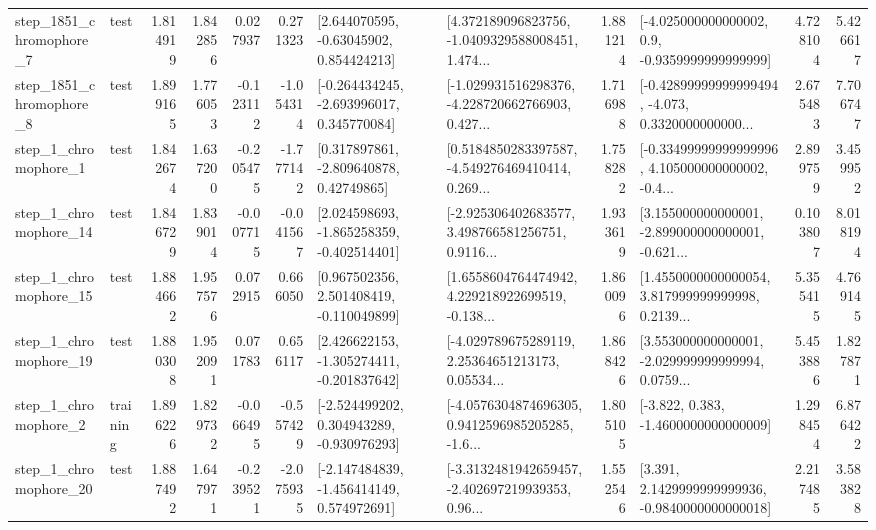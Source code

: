 \begin{tabular}{llrrrrllrlrr}
  step\_1851\_chromophore\_7 &      test &      1.814919 &    1.842856 &      0.027937 &  0.271323 &     [2.644070595, -0.63045902, 0.854424213] &  [4.372189096823756, -1.0409329588008451, 1.474... &       1.881214 &     [-4.025000000000002, 0.9, -0.9359999999999999] &            4.728104 &          5.426617 \\
  step\_1851\_chromophore\_8 &      test &      1.899165 &    1.776053 &     -0.123112 & -1.054314 &   [-0.264434245, -2.693996017, 0.345770084] &  [-1.029931516298376, -4.228720662766903, 0.427... &       1.716988 &  [-0.42899999999999494, -4.073, 0.3320000000000... &            2.675483 &          7.706747 \\
     step\_1\_chromophore\_1 &      test &      1.842674 &    1.637200 &     -0.205475 & -1.777142 &     [0.317897861, -2.809640878, 0.42749865] &  [0.5184850283397587, -4.549276469410414, 0.269... &       1.758282 &  [-0.33499999999999996, 4.105000000000002, -0.4... &            2.899759 &          3.459952 \\
    step\_1\_chromophore\_14 &      test &      1.846729 &    1.839014 &     -0.007715 & -0.041567 &   [2.024598693, -1.865258359, -0.402514401] &  [-2.925306402683577, 3.498766581256751, 0.9116... &       1.933619 &  [3.155000000000001, -2.899000000000001, -0.621... &            0.103807 &          8.018194 \\
    step\_1\_chromophore\_15 &      test &      1.884662 &    1.957576 &      0.072915 &  0.666050 &    [0.967502356, 2.501408419, -0.110049899] &  [1.6558604764474942, 4.229218922699519, -0.138... &       1.860096 &  [1.4550000000000054, 3.817999999999998, 0.2139... &            5.355415 &          4.769145 \\
    step\_1\_chromophore\_19 &      test &      1.880308 &    1.952091 &      0.071783 &  0.656117 &   [2.426622153, -1.305274411, -0.201837642] &  [-4.029789675289119, 2.25364651213173, 0.05534... &       1.868426 &  [3.553000000000001, -2.029999999999994, 0.0759... &            5.453886 &          1.827871 \\
     step\_1\_chromophore\_2 &  training &      1.896226 &    1.829732 &     -0.066495 & -0.557429 &   [-2.524499202, 0.304943289, -0.930976293] &  [-4.0576304874696305, 0.9412596985205285, -1.6... &       1.805105 &               [-3.822, 0.383, -1.4600000000000009] &            1.298454 &          6.876422 \\
    step\_1\_chromophore\_20 &      test &      1.887492 &    1.647971 &     -0.239521 & -2.075935 &   [-2.147484839, -1.456414149, 0.574972691] &  [-3.3132481942659457, -2.402697219939353, 0.96... &       1.552546 &   [3.391, 2.1429999999999936, -0.9840000000000018] &            2.217485 &          3.583828 \\

\end{tabular}
